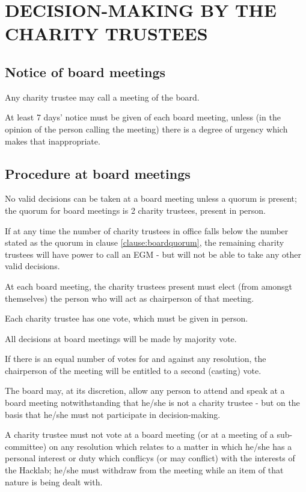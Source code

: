 \documentclass{article}
\begin{document}
\section{DECISION-MAKING BY THE CHARITY TRUSTEES}

\subsection{Notice of board meetings}

\clause Any charity trustee may call a meeting of the board.

\clause At least 7 days' notice must be given of each board meeting,
unless (in the opinion of the person calling the meeting) there is a
degree of urgency which makes that inappropriate.

\subsection{Procedure at board meetings}

\clause\label{clause:boardquorum}No valid decisions can be taken at a
board meeting unless a quorum is present; the quorum for board
meetings is 2 charity trustees, present in person.

\clause If at any time the number of charity trustees in office falls
below the number stated as the quorum in clause
\ref{clause:boardquorum}, the remaining charity trustees will have
power to call an EGM - but will not be able to take any other valid
decisions.

\clause At each board meeting, the charity trustees present must elect
(from amonsgt themselves) the person who will act as chairperson of
that meeting.

\clause Each charity trustee has one vote, which must be given in
person.

\clause All decisions at board meetings will be made by majority vote.

\clause If there is an equal number of votes for and against any
resolution, the chairperson of the meeting will be entitled to a
second (casting) vote.

\clause The board may, at its discretion, allow any person to attend
and speak at a board meeting notwithstanding that he/she is not a
charity trustee - but on the basis that he/she must not participate in
decision-making.

\clause\label{clause:conflictofinterest}A charity trustee must not
vote at a board meeting (or at a meeting of a sub-committee) on any
resolution which relates to a matter in which he/she has a personal
interest or duty which conflicys (or may conflict) with the interests
of the Hacklab; he/she must withdraw from the meeting while an item of
that nature is being dealt with.
\end{document}
